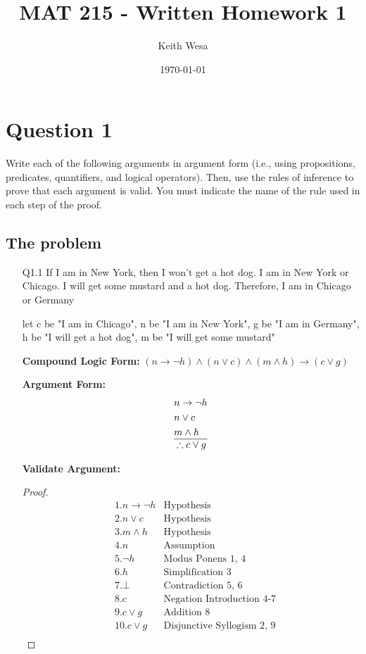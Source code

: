 \documentclass{article}
\author{Keith Wesa}
\title{MAT 215 - Written Homework 1}
\date{\today}
\begin{document}
\section*{Question 1}
Write each of the following arguments in argument form (i.e., using propositions, predicates, quantifiers, and logical operators). 
Then, use the rules of inference to prove that each argument is valid. You must indicate the name of the rule used in each step of the proof.
\subsection*{The problem}
\begin{itemize}
    \item[Q1.1] If I am in New York, then I won't get a hot dog. I am in New York or Chicago.
     I will get some mustard and a hot dog. Therefore, I am in Chicago or Germany
     \item[] let c be "I am in Chicago", n be "I am in New York", g be "I am in Germany", h be "I will get a hot dog", 
        m be "I will get some mustard"
    \item[] \textbf{Compound Logic Form: } $(n \rightarrow \neg h) \land (n \lor c) \land (m \land h) \rightarrow (c \lor g)$
    \item[] \textbf{Argument Form: }
    \begin{equation*}
        \begin{aligned}
            & n \rightarrow \neg h \\
            & n \lor c \\
            & m \land h \\
             \hline
            &\therefore c \lor g
        \end{aligned}
    \end{equation*}
    \item[] \textbf{Validate Argument: }
    \begin{proof}
    \begin{equation*}
        \begin{aligned}
            & 1. n \rightarrow \neg h & \text{Hypothesis} \\
            & 2. n \lor c & \text{Hypothesis} \\
            & 3. m \land h & \text{Hypothesis} \\
            & 4. n & \text{Assumption} \\
            & 5. \neg h & \text{Modus Ponens 1, 4} \\
            & 6. h & \text{Simplification 3} \\
            & 7. \bot & \text{Contradiction 5, 6} \\
            & 8. c & \text{Negation Introduction 4-7} \\
            & 9. c \lor g & \text{Addition 8} \\
            & 10. \boxed{c \lor g} & \text{Disjunctive Syllogism 2, 9} \\
        \end{aligned}
    \end{equation*}
    \end{proof}
\end{itemize}
\end{document}
